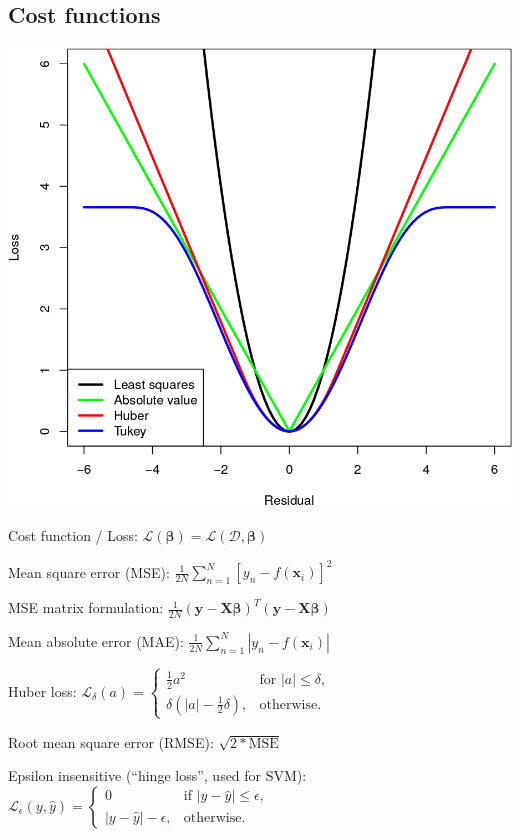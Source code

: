 \documentclass[10pt,a4paper,landscape]{article}
\providecommand{\bf}[1]{\ensuremath{\mathbf{#1}}}
\newcommand{\bbeta}{\boldsymbol\beta}
\begin{document}
\begin{multicols*}{4}
\subsection{Cost functions}
\begin{colfig}
\centering
\includegraphics[width=\linewidth]{images/error-functions.png}
\end{colfig}

Cost function / Loss: $\mathcal{L}(\bbeta) = \mathcal{L}(\mathcal{D},\bbeta)$

Mean square error (MSE): $\frac{1}{2N} \sum_{n=1}^{N}\left[y_n-f(\bf{x}_i) \right]^2$

MSE matrix formulation: $\frac{1}{2N} (\bf{y - X \beta})^T (\bf{y - X \beta})$

Mean absolute error (MAE): $\frac{1}{2N} \sum_{n=1}^{N}\left | y_n-f(\bf{x}_i) \right |$

Huber loss: $\mathcal{L}_\delta (a) = \begin{cases}
\frac{1}{2}{a^2}                   & \text{for } |a| \le \delta, \\
\delta (|a| - \frac{1}{2}\delta ), & \text{otherwise.}
\end{cases}$

Root mean square error (RMSE): $\sqrt{2 * \text{MSE}}$

Epsilon insensitive (``hinge loss'', used for SVM):
$\mathcal{L}_{\epsilon}(y, \hat{y}) = \begin{cases}
0                   & \text{if } |y - \hat y| \le \epsilon, \\
|y - \hat y| - \epsilon, & \text{otherwise.}
\end{cases}$


\end{multicols*}
\end{document}
